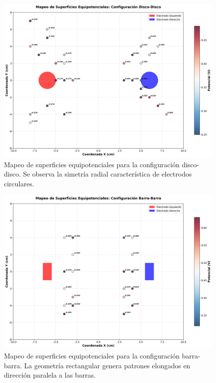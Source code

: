 \documentclass[11pt,twocolumn]{article}
\begin{document}
\begin{figure}[h]
\centering
\includegraphics[width=0.9\columnwidth]{graficas/mapeo_disco_disco.png}
\caption{Mapeo de superficies equipotenciales para la configuración disco-disco. Se observa la simetría radial característica de electrodos circulares.}
\label{fig:mapeo_disco_disco}
\end{figure}

\begin{figure}[h]
\centering
\includegraphics[width=0.9\columnwidth]{graficas/mapeo_barra_barra.png}
\caption{Mapeo de superficies equipotenciales para la configuración barra-barra. La geometría rectangular genera patrones elongados en dirección paralela a las barras.}
\label{fig:mapeo_barra_barra}
\end{figure}
\end{document}
